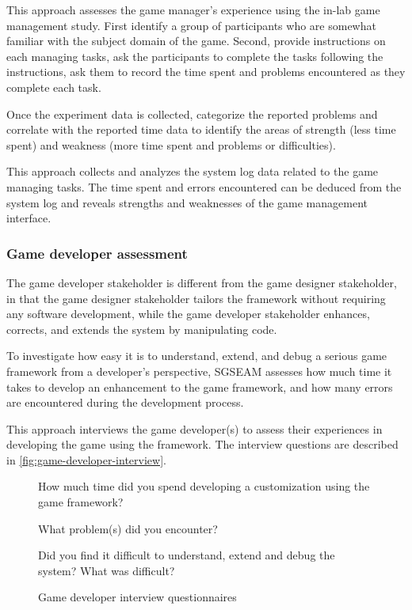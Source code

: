 \label{In-lab game management study}

This approach assesses the game manager's experience using the in-lab game management study.  First identify a group 
of participants who are somewhat familiar with the subject domain of the game. Second, provide instructions on 
each managing tasks, ask the participants to complete the tasks following the instructions, ask them to record 
the time spent and problems encountered as they complete each task.

Once the experiment data is collected, categorize the reported problems and correlate with the reported time data 
to identify the areas of strength (less time spent) and weakness (more time spent and problems or difficulties). 

\label{Game management log data analysis}

This approach collects and analyzes the system log data related to the game managing tasks. The time spent and errors encountered can be deduced from the system log and reveals strengths and weaknesses of the game management interface.

\subsubsection{Game developer assessment}

The game developer stakeholder is different from the game designer stakeholder, in that the
game designer stakeholder tailors the framework without requiring any software
development, while the game developer stakeholder enhances, corrects, and extends the system by
manipulating code. 

To investigate how easy it is to understand, extend, and debug a serious game framework from a developer's 
perspective, SGSEAM assesses how much time it takes to develop an
enhancement to the game framework, and how many errors are encountered
during the development process.

\label{Post-hoc game developer interview}

This approach interviews the game developer(s) to assess their experiences in developing the game 
using the framework. The interview questions are described in \autoref{fig:game-developer-interview}.  
 
\begin{figure}[ht!]
\begin{mybox}
\begin{compactenum}
\item How much time did you spend developing a customization using the game framework?
\item What problem(s) did you encounter?
\item Did you find it difficult to understand, extend and debug the system? What was difficult?
\end{compactenum}
\end{mybox}
\caption{Game developer interview questionnaires}
\label{fig:game-developer-interview}  
\end{figure}

